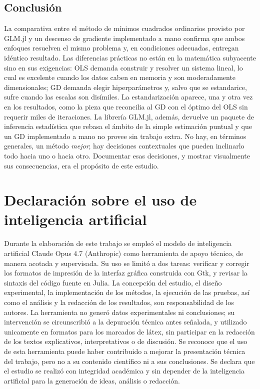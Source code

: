 \documentclass[11pt,a4paper]{article}
\begin{document}
\subsection{Conclusión}

La comparativa entre el método de mínimos cuadrados ordinarios provisto por GLM.jl y un descenso de gradiente implementado a mano confirma que ambos enfoques resuelven el mismo problema y, en condiciones adecuadas, entregan idéntico resultado. Las diferencias prácticas no están en la matemática subyacente sino en sus exigencias: OLS demanda construir y resolver un sistema lineal, lo cual es excelente cuando los datos caben en memoria y son moderadamente dimensionales; GD demanda elegir hiperparámetros y, salvo que se estandarice, sufre cuando las escalas son disímiles. La estandarización aparece, una y otra vez en los resultados, como la pieza que reconcilia al GD con el óptimo del OLS sin requerir miles de iteraciones. La librería GLM.jl, además, devuelve un paquete de inferencia estadística que rebasa el ámbito de la simple estimación puntual y que un GD implementado a mano no provee sin trabajo extra. No hay, en términos generales, un método \textit{mejor}; hay decisiones contextuales que pueden inclinarlo todo hacia uno o hacia otro. Documentar esas decisiones, y mostrar visualmente sus consecuencias, era el propósito de este estudio.

\section*{Declaración sobre el uso de inteligencia artificial}

Durante la elaboración de este trabajo se empleó el modelo de inteligencia artificial Claude Opus 4.7 (Anthropic) como herramienta de apoyo técnico, de manera acotada y supervisada. Su uso se limitó a dos tareas: verificar y corregir los formatos de impresión de la interfaz gráfica construida con Gtk, y revisar la sintaxis del código fuente en Julia. La concepción del estudio, el diseño experimental, la implementación de los métodos, la ejecución de las pruebas, así como el análisis y la redacción de los resultados, son responsabilidad de los autores. La herramienta no generó datos experimentales ni conclusiones; su intervención se circunscribió a la depuración técnica antes señalada, y utilizado unicamente en formatos para los marcados de látex,
sin participar en la redacción de los textos explicativos, interpretativos o de discusión. Se reconoce que el uso de esta herramienta puede haber contribuido a mejorar la presentación técnica del trabajo, pero no a su contenido científico ni a sus conclusiones. Se declara que el estudio se realizó con integridad académica y sin depender de la inteligencia artificial para la generación de ideas, análisis o redacción.
\end{document}
